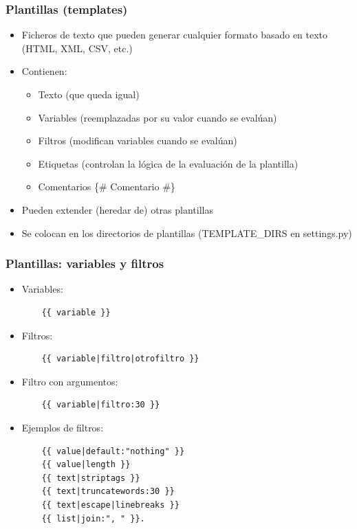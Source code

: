 \begin{frame}
\frametitle{Plantillas (templates)}

\begin{itemize}
\item Ficheros de texto que pueden generar cualquier formato basado en texto (HTML, XML, CSV, etc.)
\item Contienen:
  \begin{itemize}
  \item Texto (que queda igual)
  \item Variables (reemplazadas por su valor cuando se evalúan)
  \item Filtros (modifican variables cuando se evalúan)
  \item Etiquetas (controlan la lógica de la evaluación de la plantilla)
  \item Comentarios \{\# Comentario \#\}
  \end{itemize}
\item Pueden extender (heredar de) otras plantillas
\item Se colocan en los directorios de plantillas (TEMPLATE\_DIRS en settings.py) 
\end{itemize}
\end{frame}

\begin{frame}[fragile]
\frametitle{Plantillas: variables y filtros}

\begin{itemize}
\item Variables: 
\begin{verbatim}
    {{ variable }}
\end{verbatim}
\item Filtros:
\begin{verbatim}
    {{ variable|filtro|otrofiltro }}
\end{verbatim}
\item Filtro con argumentos:
\begin{verbatim}
    {{ variable|filtro:30 }}
\end{verbatim}
\item Ejemplos de filtros:
\begin{verbatim}
    {{ value|default:"nothing" }}
    {{ value|length }}
    {{ text|striptags }}
    {{ text|truncatewords:30 }}
    {{ text|escape|linebreaks }}
    {{ list|join:", " }}.
\end{verbatim}
\end{itemize}
\end{frame}

